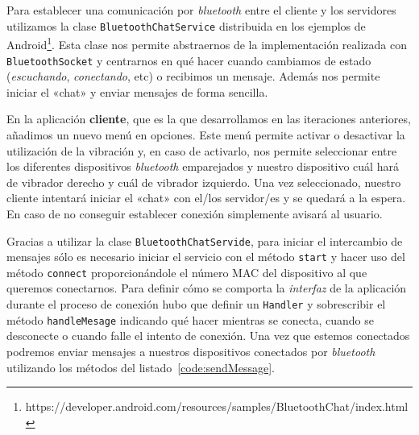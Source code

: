 Para establecer una comunicación por \emph{bluetooth} entre el cliente y los servidores utilizamos
la clase \texttt{BluetoothChatService} distribuida en los ejemplos de
Android\footnote{https://developer.android.com/resources/samples/BluetoothChat/index.html}. Esta
clase nos permite abstraernos de la implementación realizada con \texttt{BluetoothSocket} y
centrarnos en qué hacer cuando cambiamos de estado (\emph{escuchando}, \emph{conectando}, etc) o
recibimos un mensaje. Además nos permite iniciar el «chat» y enviar mensajes de forma sencilla.

En la aplicación \textbf{cliente}, que es la que desarrollamos en las iteraciones anteriores,
añadimos un nuevo menú en opciones. Este menú permite activar o desactivar la utilización de la
vibración y, en caso de activarlo, nos permite seleccionar entre los diferentes dispositivos
\emph{bluetooth} emparejados y nuestro dispositivo cuál hará de vibrador derecho y cuál de vibrador
izquierdo. Una vez seleccionado, nuestro cliente intentará iniciar el «chat» con el/los servidor/es
y se quedará a la espera. En caso de no conseguir establecer conexión simplemente avisará al
usuario.

Gracias a utilizar la clase \texttt{BluetoothChatServide}, para iniciar el intercambio de mensajes
sólo es necesario iniciar el servicio con el método \texttt{start} y hacer uso del método
\texttt{connect} proporcionándole el número \acf{MAC} del dispositivo al que queremos
conectarnos. Para definir cómo se comporta la \emph{interfaz} de la aplicación durante el proceso de
conexión hubo que definir un \texttt{Handler} y sobrescribir el método \texttt{handleMesage}
indicando qué hacer mientras se conecta, cuando se desconecte o cuando falle el intento de
conexión. Una vez que estemos conectados podremos enviar mensajes a nuestros dispositivos conectados
por \emph{bluetooth} utilizando los métodos del listado~\ref{code:sendMessage}.

